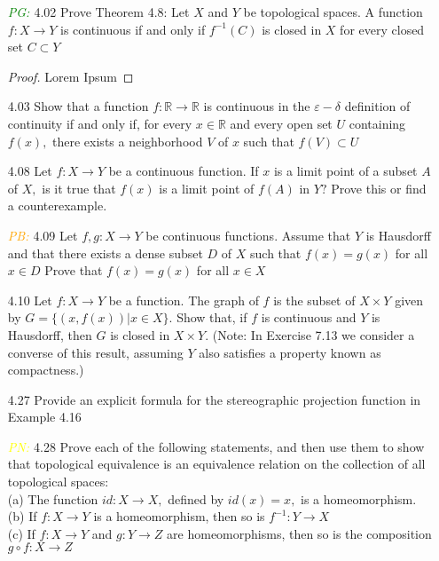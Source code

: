 \documentclass[12pt]{article}
\newcommand{\pg}{\textit{\textcolor{green}{PG: }}}
\newcommand{\pn}{\textit{\textcolor{yellow}{PN: }}}
\newcommand{\pb}{\textit{\textcolor{orange}{PB: }}}
\begin{document}
\begin{enumerate}
	(b) Let $Y$ have the trivial topology and $X$ be an arbitrary topological space. Show that every function $f: X \rightarrow Y$ is continuous.\\
	
	\item[\pg4.02] Prove Theorem 4.8: Let $X$ and $Y$ be topological spaces. A function $f: X \rightarrow Y$ is continuous if and only if $f^{-1}(C)$ is closed in $X$ for every closed set $C \subset Y$
		\begin{proof}
			Lorem Ipsum
		\end{proof}
	
	\item[4.03] Show that a function $f: \mathbb{R} \rightarrow \mathbb{R}$ is continuous in the $\varepsilon-\delta$ definition of continuity if and only if, for every $x \in \mathbb{R}$ and every open set $U$ containing $f(x),$ there exists a neighborhood $V$ of $x$ such that $f(V) \subset U$\\
	
	\item[4.08] Let $f: X \rightarrow Y$ be a continuous function. If $x$ is a limit point of a subset $A$ of $X,$ is it true that $f(x)$ is a limit point of $f(A)$ in $Y ?$ Prove this or find a counterexample.\\
	
	\item[\pb4.09] Let $f, g: X \rightarrow Y$ be continuous functions. Assume that $Y$ is Hausdorff and that there exists a dense subset $D$ of $X$ such that $f(x)=g(x)$ for all $x \in D$ Prove that $f(x)=g(x)$ for all $x \in X$\\
	
	\item[4.10] Let $f: X \rightarrow Y$ be a function. The graph of $f$ is the subset of $X \times Y$ given by $G=\{(x, f(x)) | x \in X\} .$ Show that, if $f$ is continuous and $Y$ is Hausdorff, then $G$ is closed in $X \times Y$. (Note: In Exercise 7.13 we consider a converse of this result, assuming $Y$ also satisfies a property known as compactness.)\\
	
	\item[4.27] Provide an explicit formula for the stereographic projection function in Example 4.16\\
	
	\item[\pn4.28] Prove each of the following statements, and then use them to show that topological equivalence is an equivalence relation on the collection of all topological spaces:\\
	(a) The function $i d: X \rightarrow X,$ defined by $i d(x)=x,$ is a homeomorphism.\\
	(b) If $f: X \rightarrow Y$ is a homeomorphism, then so is $f^{-1}: Y \rightarrow X$\\
	(c) If $f: X \rightarrow Y$ and $g: Y \rightarrow Z$ are homeomorphisms, then so is the composition $g \circ f: X \rightarrow Z$\\
	

\end{enumerate}
\end{document}
